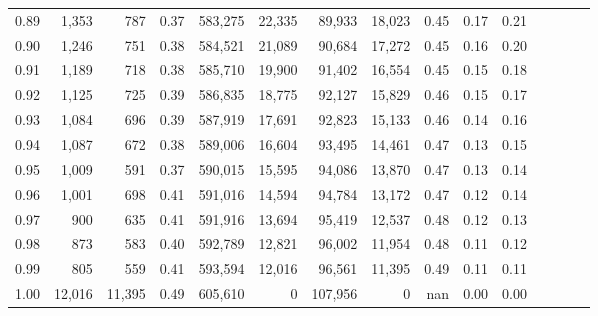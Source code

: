 \begin{tabular}{rrrcrrrrrrrrrrr}
0.89 &   1,353 &     787 &                                       0.37 &  583,275 &   22,335 &   89,933 &   18,023 &  0.45 &  0.17 &                         0.21 \\
0.90 &   1,246 &     751 &                                       0.38 &  584,521 &   21,089 &   90,684 &   17,272 &  0.45 &  0.16 &                         0.20 \\
0.91 &   1,189 &     718 &                                       0.38 &  585,710 &   19,900 &   91,402 &   16,554 &  0.45 &  0.15 &                         0.18 \\
0.92 &   1,125 &     725 &                                       0.39 &  586,835 &   18,775 &   92,127 &   15,829 &  0.46 &  0.15 &                         0.17 \\
0.93 &   1,084 &     696 &                                       0.39 &  587,919 &   17,691 &   92,823 &   15,133 &  0.46 &  0.14 &                         0.16 \\
0.94 &   1,087 &     672 &                                       0.38 &  589,006 &   16,604 &   93,495 &   14,461 &  0.47 &  0.13 &                         0.15 \\
0.95 &   1,009 &     591 &                                       0.37 &  590,015 &   15,595 &   94,086 &   13,870 &  0.47 &  0.13 &                         0.14 \\
0.96 &   1,001 &     698 &                                       0.41 &  591,016 &   14,594 &   94,784 &   13,172 &  0.47 &  0.12 &                         0.14 \\
0.97 &     900 &     635 &                                       0.41 &  591,916 &   13,694 &   95,419 &   12,537 &  0.48 &  0.12 &                         0.13 \\
0.98 &     873 &     583 &                                       0.40 &  592,789 &   12,821 &   96,002 &   11,954 &  0.48 &  0.11 &                         0.12 \\
0.99 &     805 &     559 &                                       0.41 &  593,594 &   12,016 &   96,561 &   11,395 &  0.49 &  0.11 &                         0.11 \\
1.00 &  12,016 &  11,395 &                                       0.49 &  605,610 &        0 &  107,956 &        0 &   nan &  0.00 &                         0.00 \\
\bottomrule
\end{tabular}
